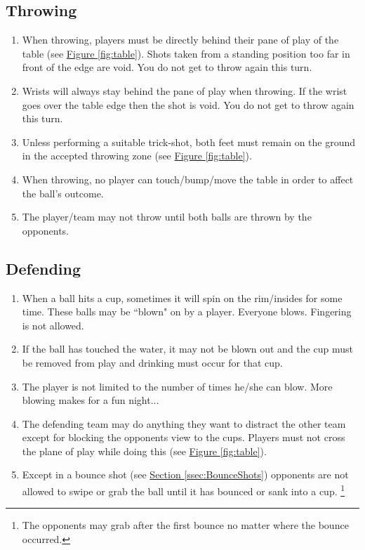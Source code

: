 	\subsection{Throwing}\label{ssec:Throwing}
        \begin{enumerate}[label=(\roman*), ref=\roman*]
            \item \label{itm:Throwing,stand_behind} When throwing, players must be directly behind their pane of play of the table (see \hyperref[fig:table]{Figure \ref*{fig:table}}).
                Shots taken from a standing position too far in front of the edge are void. You do not get to throw again this turn. 
            \item \label{itm:Throwing,wrists} Wrists will always stay behind the pane of play when throwing.
                If the wrist goes over the table edge then the shot is void. You do not get to throw again this turn. 
            \item \label{itm:Throwing,feet} Unless performing a suitable trick-shot, both feet must remain on the ground in the accepted throwing zone (see \hyperref[fig:table]{Figure \ref*{fig:table}}). 
            \item \label{itm:Throwing,bumping_table} When throwing, no player can touch/bump/move the table in order to affect the ball's outcome. 
            \item \label{itm:Throwing,possesion} The player/team may not throw until both balls are thrown by the opponents. 
        \end{enumerate}
    \subsection{Defending}\label{ssec:Defending}
		\begin{enumerate}[label=(\roman*), ref=\roman*]
            \item \label{itm:Defending,blowing} When a ball hits a cup, sometimes it will spin on the rim/insides for some time.
                These balls may be ``blown" on by a player.
                Everyone blows.
                Fingering is not allowed. 
            \item \label{ssec:Defending,blowing_voids} If the ball has touched the water, it may not be blown out and the cup must be removed from play and drinking must occur for that cup. 
            \item \label{itm:Defending,blowing_times} The player is not limited to the number of times he/she can blow. More blowing makes for a fun night... 
            \item \label{itm:Defending,pysycedout} The defending team may do anything they want to distract the other team except for blocking the opponents view to the cups.
                Players must not cross the plane of play while doing this (see \hyperref[fig:table]{Figure \ref*{fig:table}}). 
            \item \label{itm:Defending,balltouching} Except in a bounce shot (see \hyperref[ssec:BounceShots]{Section \ref*{ssec:BounceShots}}) opponents are not allowed to swipe or grab the ball until it has bounced or sank into a cup. \footnote{The opponents may grab after the first bounce no matter where the bounce occurred.}
        \end{enumerate}
